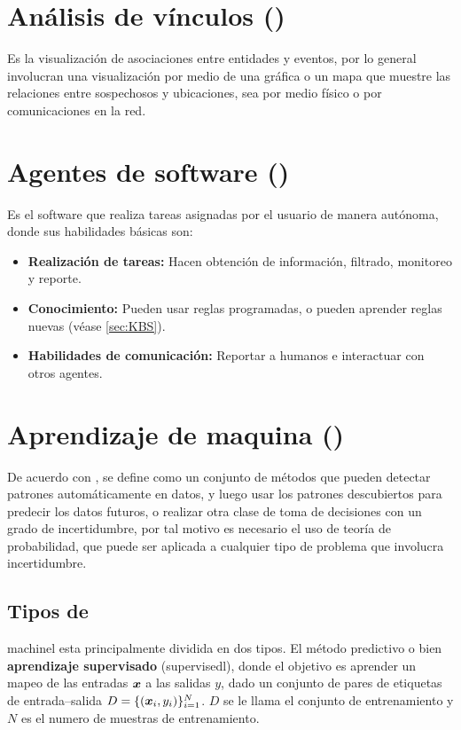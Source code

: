 
\section{Análisis de vínculos ()}
Es la visualización de asociaciones entre entidades y eventos, por lo general involucran una visualización por medio de una gráfica o un mapa que muestre las relaciones entre sospechosos y ubicaciones, sea por medio físico o por comunicaciones en la red.


\section{Agentes de software ()}
Es el software que realiza tareas asignadas por el usuario de manera autónoma, donde sus habilidades básicas son:
\begin{itemize}
\item \textbf{Realización de tareas:} Hacen obtención de información, filtrado, monitoreo y reporte.
\item \textbf{Conocimiento:} Pueden usar reglas programadas, o pueden aprender reglas nuevas (véase \ref{sec:KBS}).
\item \textbf{Habilidades de comunicación:} Reportar a humanos e interactuar con otros agentes.
\end{itemize}


\section{Aprendizaje de maquina ()} \label{sec:ML}
De acuerdo con \cite{murphymachinel}, se define como un conjunto de métodos que pueden detectar patrones automáticamente en datos, y luego usar los patrones descubiertos para predecir los datos futuros, o realizar otra clase de toma de decisiones con un grado de incertidumbre, por tal motivo es necesario el uso de teoría de probabilidad, que puede ser aplicada a cualquier tipo de problema que involucra incertidumbre.

\subsection{Tipos de }
\gls{machinel} esta principalmente dividida en dos tipos. El método predictivo o bien \textbf{aprendizaje supervisado} (\gls{supervisedl}), donde el objetivo es aprender un mapeo de las entradas ${\bm{x}}$ a las salidas $y$, dado un conjunto de pares de etiquetas de entrada--salida $D = \{({\bm{x}}_i, y_i)\}_{i=1}^{N}$. $D$ se le llama el conjunto de entrenamiento y $N$ es el numero de muestras de entrenamiento.


